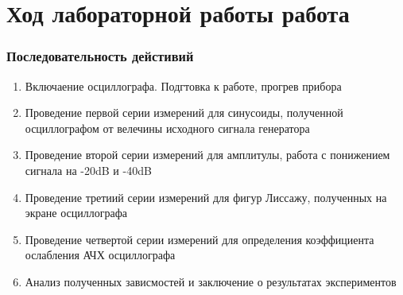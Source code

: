 \documentclass[xcolor=table]{beamer}
\begin{document}
\section{Ход лабораторной работы работа}
\begin{frame}
\frametitle{Последовательность дейстивий}
\begin{enumerate}
    \item Включаение осциллографа. Подгтовка к работе, прогрев прибора
    \item Проведение первой серии измерений для синусоиды, полученной осциллографом от велечины исходного сигнала генератора
    \item Проведение второй серии измерений для амплитулы, работа с понижением сигнала на -20dB и -40dB 
    \item Проведение третиий серии измерений для фигур Лиссажу, полученных на экране осциллографа 
    \item Проведение четвертой серии измерений для определения коэффициента ослабления АЧХ осциллографа
    \item Анализ полученных зависмостей и заключение о результатах экспериментов
\end{enumerate}
\end{frame}
\end{document}
